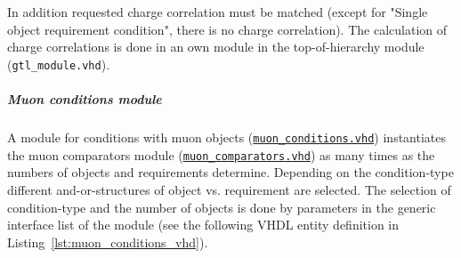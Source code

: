 In addition requested charge correlation must be matched (except for "Single object requirement condition", there is no charge correlation).
The calculation of charge correlations is done in an own module in the top-of-hierarchy module (\texttt{gtl\_module.vhd}).\\

\subparagraph{Muon conditions module}
\label{sec:gtl:muon_condidions_module}

A module for conditions with muon objects (\href{https://github.com/cms-l1-globaltrigger/mp7_ugt_legacy/tree/master/firmware/hdl/gt_mp7_core/gtl_fdl_wrapper/gtl/muon_conditions.vhd}{\texttt{muon\_conditions.vhd}}) instantiates the muon comparators module (\href{https://github.com/cms-l1-globaltrigger/mp7_ugt_legacy/tree/master/firmware/hdl/gt_mp7_core/gtl_fdl_wrapper/gtl/muon_comparators.vhd}{\texttt{muon\_comparators.vhd}}) as many times as the numbers of objects and requirements determine. Depending on the condition-type different and-or-structures of object vs. requirement are selected.
The selection of condition-type and the number of objects is done by parameters in the generic interface list of the module
(see the following VHDL entity definition in Listing~\ref{lst:muon_conditions_vhd}).\\

\clearpage


\clearpage

